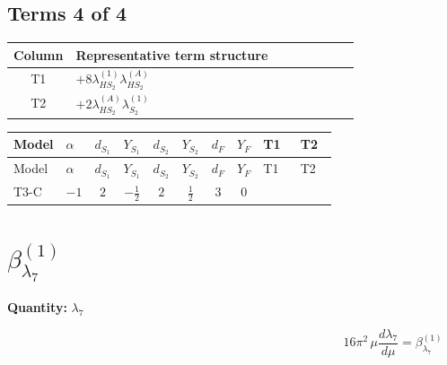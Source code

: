\documentclass[8pt]{article}
\begin{document}
\begin{landscape}
\subsection*{Terms 4 of 4}
\begin{center}
\begin{tabular}{@{}c >{\raggedright\arraybackslash}p{0.82\linewidth}@{}}
\toprule
Column & Representative term structure \\
\midrule
T1 & \(\displaystyle +8 {\lambda_{HS_2}^{(1)}} {\lambda_{HS_2}^{(A)}}\) \\
\midrule
T2 & \(\displaystyle +2 {\lambda_{HS_2}^{(A)}} {\lambda_{S_2}^{(1)}}\) \\
\midrule
\bottomrule
\end{tabular}
\end{center}
\smallskip
\tiny
\begin{longtable}{@{}llcccccc >{\raggedright\arraybackslash}p{0.21\linewidth} >{\raggedright\arraybackslash}p{0.21\linewidth}@{}}
\toprule
Model & $\alpha$ & $d_{S_1}$ & $Y_{S_1}$ & $d_{S_2}$ & $Y_{S_2}$ & $d_F$ & $Y_F$ & T1 & T2 \\
\midrule
\endfirsthead
\toprule
Model & $\alpha$ & $d_{S_1}$ & $Y_{S_1}$ & $d_{S_2}$ & $Y_{S_2}$ & $d_F$ & $Y_F$ & T1 & T2 \\
\midrule
\endhead
T3-C & $-1$ & $2$ & $-\frac{1}{2}$ & $2$ & $\frac{1}{2}$ & $3$ & $0$ & \scriptsize\adjustbox{max width=\linewidth}{$\begin{gathered} +8 {\lambda_{HS_2}^{(1)}} {\lambda_{HS_2}^{(A)}}\end{gathered}$} & \scriptsize\adjustbox{max width=\linewidth}{$\begin{gathered} +2 {\lambda_{HS_2}^{(A)}} {\lambda_{S_2}^{(1)}}\end{gathered}$} \\
\midrule
\bottomrule
\end{longtable}
\clearpage
\section*{$\beta_{\lambda_{7}}^{(1)}$}
\noindent\textbf{Quantity: }$\lambda_{7}$\par\smallskip
\[16\pi^2\,\mu\frac{d \lambda_{7}}{d\mu}=\beta_{\lambda_{7}}^{(1)}\]

\end{landscape}
\end{document}
